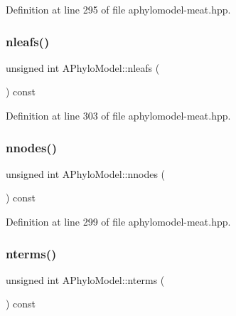 Definition at line 295 of file aphylomodel-\/meat.\+hpp.

\mbox{\label{class_a_phylo_model_adfb761d08367323cd94e917a5249bd86}} 
\subsubsection{\texorpdfstring{nleafs()}{nleafs()}}
{\footnotesize\ttfamily unsigned int A\+Phylo\+Model\+::nleafs (\begin{DoxyParamCaption}{ }\end{DoxyParamCaption}) const\hspace{0.3cm}{\ttfamily [inline]}}



Definition at line 303 of file aphylomodel-\/meat.\+hpp.

\mbox{\label{class_a_phylo_model_a5a13086298e421d18ed60e6ecfced009}} 
\subsubsection{\texorpdfstring{nnodes()}{nnodes()}}
{\footnotesize\ttfamily unsigned int A\+Phylo\+Model\+::nnodes (\begin{DoxyParamCaption}{ }\end{DoxyParamCaption}) const\hspace{0.3cm}{\ttfamily [inline]}}



Definition at line 299 of file aphylomodel-\/meat.\+hpp.

\mbox{\label{class_a_phylo_model_ada9ba3e2df8586216573fa27566d92cb}} 
\subsubsection{\texorpdfstring{nterms()}{nterms()}}
{\footnotesize\ttfamily unsigned int A\+Phylo\+Model\+::nterms (\begin{DoxyParamCaption}{ }\end{DoxyParamCaption}) const\hspace{0.3cm}{\ttfamily [inline]}}



